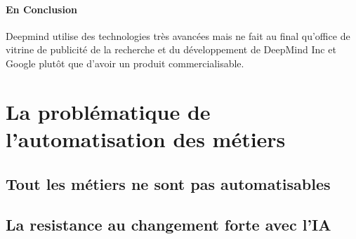 \paragraph{En Conclusion} Deepmind utilise des technologies très avancées mais 
ne fait au final qu'office de vitrine de publicité de la recherche et du développement 
de DeepMind Inc et Google plutôt que d'avoir un produit commercialisable. 


\newpage
\section{La problématique de l'automatisation des métiers}

\subsection*{Tout les métiers ne sont pas automatisables}
\subsection*{La resistance au changement forte avec l'IA}
